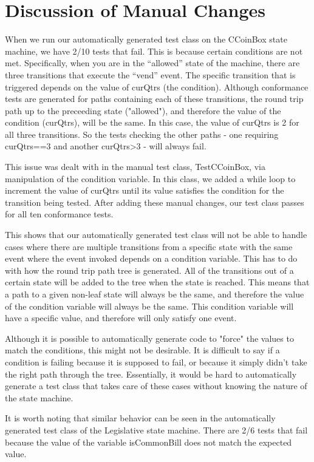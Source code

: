 \documentclass[11pt, a4paper]{article}
\begin{document}
\section{Discussion of Manual Changes}
When we run our automatically generated test class on the CCoinBox state machine, we have 2/10 tests that fail. This is because certain conditions are not met. Specifically, when you are in the “allowed” state of the machine, there are three transitions that execute the “vend” event. The specific transition that is triggered depends on the value of curQtrs (the condition). Although conformance tests are generated for paths containing each of these transitions, the round trip path up to the preceeding state ("allowed"), and therefore the value of the condition (curQtrs), will be the same. In this case, the value of curQtrs is 2 for all three transitions. So the tests checking the other paths - one requiring curQtrs==3 and another curQtrs>3 - will always fail. 

This issue was dealt with in the manual test class, TestCCoinBox, via manipulation of the condition variable. In this class, we added a while loop to increment the value of curQtrs until its value satisfies the condition for the transition being tested. After adding these manual changes, our test class passes for all ten conformance tests.

This shows that our automatically generated test class will not be able to handle cases where there are multiple transitions from a specific state with the same event where the event invoked depends on a condition variable. This has to do with how the round trip path tree is generated. All of the transitions out of a certain state will be added to the tree when the state is reached. This means that a path to a given non-leaf state will always be the same, and therefore the value of the condition variable will always be the same. This condition variable will have a specific value, and therefore will only satisfy one event. 

Although it is possible to automatically generate code to "force" the values to match the conditions, this might not be desirable. It is difficult to say if a condition is failing because it is supposed to fail, or because it simply didn't take the right path through the tree. Essentially, it would be hard to automatically generate a test class that takes care of these cases without knowing the nature of the state machine. 

It is worth noting that similar behavior can be seen in the automatically generated test class of the Legislative state machine. There are 2/6 tests that fail because the value of the variable isCommonBill does not match the expected value.
\end{document}
